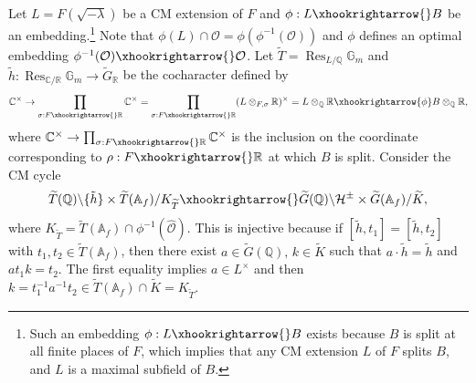 \documentclass{amsart}
\numberwithin{equation}{subsection}
\numberwithin{theorem}{section}
\theoremstyle{definition}
\theoremstyle{remark}
\newcommand{\bA}{\mathbb{A}}
\newcommand{\bC}{\mathbb{C}}
\newcommand{\bG}{\mathbb{G}}
\newcommand{\bQ}{\mathbb{Q}}
\newcommand{\bR}{\mathbb{R}}
\newcommand{\cO}{\mathcal{O}}
\DeclareMathOperator{\Res}{Res}
\begin{document}
Let $L = F(\sqrt{-\lambda})$ be a CM extension of $F$ and $\phi: L\xhookrightarrow{} B$ be an embedding.\footnote{Such an embedding $\phi: L \xhookrightarrow{} B$ exists because $B$ is split at all finite places of $F$, which implies that any CM extension $L$ of $F$ splits $B$, and $L$ is a maximal subfield of $B$.}
Note that $\phi(L)\cap \cO = \phi(\phi^{-1}(\cO))$ and $\phi$ defines an optimal embedding $\phi^{-1}(\cO)\xhookrightarrow{}\cO$. 
Let $\widetilde{T} = \Res_{L/\bQ}\bG_m$ and $\tilde{h}: \Res_{\bC/\bR} \bG_m \to \widetilde{G}_\bR$ be the cocharacter defined by \begin{equation} \label{eq:CMcyclecocharacter}
    \bC^\times \to \prod_{\sigma:F\xhookrightarrow{}\bR} \bC^\times = \prod_{\sigma:F\xhookrightarrow{}\bR} (L\otimes_{F, \sigma}\bR)^\times  = L\otimes_{\bQ}\bR\xhookrightarrow{\phi}B\otimes_{\bQ}\bR, 
\end{equation} where $ \bC^\times \to \prod_{\sigma:F\xhookrightarrow{}\bR} \bC^\times$ is the inclusion on the coordinate corresponding to $\rho: F\xhookrightarrow{}\bR$ at which $B$ is split. Consider the CM cycle \begin{equation}\label{eq:CMcycle}\widetilde{T}(\bQ) \backslash \{\tilde{h}\} \times\widetilde{T}(\bA_f) / K_{\widetilde{T}} \xhookrightarrow{}\widetilde{G}(\bQ) \backslash \mathcal{H}^\pm \times\widetilde{G}(\bA_f) / \widetilde{K},\end{equation} where $K_{\widetilde{T}} = \widetilde{T}(\bA_f) \cap \phi^{-1}(\mathcal{\widehat{O}})$. This is injective because if $[\tilde{h},t_1] = [\tilde{h},t_2]$ with $t_1, t_2\in \widetilde{T}(\bA_f)$, then there exist $a\in \widetilde{G}(\bQ), \, k\in \widetilde{K}$ such that $a\cdot \tilde{h} = \tilde{h}$ and $ at_1k= t_2$. The first equality implies $a\in L^\times$ and then $k = t_1^{-1}a^{-1}t_2 \in \widetilde{T}(\bA_f) \cap \widetilde{K} =K_{\widetilde{T}}$. 
\end{document}
